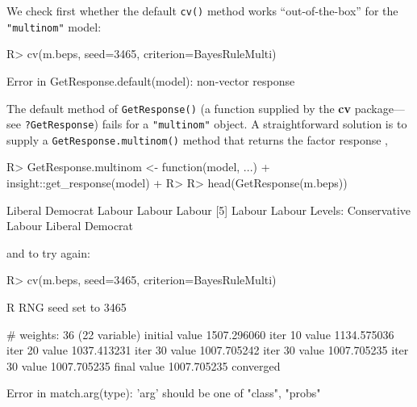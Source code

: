 \documentclass[
]{jss}
\begin{document}
We check first whether the default \texttt{cv()} method works
``out-of-the-box'' for the \texttt{"multinom"} model:

\begin{CodeChunk}
\begin{CodeInput}
R> cv(m.beps, seed=3465, criterion=BayesRuleMulti)
\end{CodeInput}
\begin{CodeOutput}
Error in GetResponse.default(model): non-vector response
\end{CodeOutput}
\end{CodeChunk}

The default method of \texttt{GetResponse()} (a function supplied by the
\textbf{cv} package---see \texttt{?GetResponse}) fails for a
\texttt{"multinom"} object. A straightforward solution is to supply a
\texttt{GetResponse.multinom()} method that returns the factor response
\citep[using the \texttt{get\_response()} function from the
\textbf{insight} package,][]{LudeckeWaggonerMakowski:2019},

\begin{CodeChunk}
\begin{CodeInput}
R> GetResponse.multinom <- function(model, ...) {
+   insight::get_response(model)
+ }
R> 
R> head(GetResponse(m.beps))
\end{CodeInput}
\begin{CodeOutput}
[1] Liberal Democrat Labour           Labour           Labour          
[5] Labour           Labour          
Levels: Conservative Labour Liberal Democrat
\end{CodeOutput}
\end{CodeChunk}

and to try again:

\begin{CodeChunk}
\begin{CodeInput}
R> cv(m.beps, seed=3465, criterion=BayesRuleMulti)
\end{CodeInput}
\begin{CodeOutput}
R RNG seed set to 3465
\end{CodeOutput}
\begin{CodeOutput}
# weights:  36 (22 variable)
initial  value 1507.296060 
iter  10 value 1134.575036
iter  20 value 1037.413231
iter  30 value 1007.705242
iter  30 value 1007.705235
iter  30 value 1007.705235
final  value 1007.705235 
converged
\end{CodeOutput}
\begin{CodeOutput}
Error in match.arg(type): 'arg' should be one of "class", "probs"
\end{CodeOutput}
\end{CodeChunk}
\end{document}
